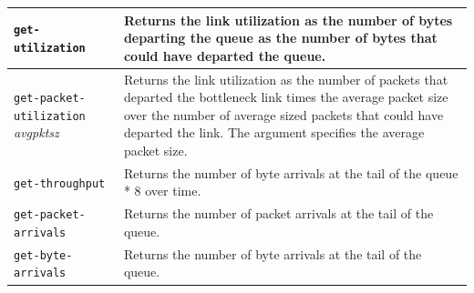 \documentclass[11pt]{article}
\begin{document}
\begin{table}[ht]
\begin{center}
\begin{tabular}{|l|l|}\hline
\verb|get-utilization|         & 
  \begin{minipage}[c]{3.5in}
  \vspace{0.05in}
  Returns the link utilization as the number of bytes departing 
  the queue as the number of bytes that could have departed the queue.
  \vspace{0.05in}
  \end{minipage} \\ \hline

\verb|get-packet-utilization| \emph{avgpktsz}& 
  \begin{minipage}[c]{3.5in} 
  \vspace{0.05in}
  Returns the link utilization as the number of packets that departed
  the bottleneck link times the average packet size over the number of
  average sized packets that could have departed the link.  The
  argument specifies the average packet size.
  \vspace{0.05in}
  \end{minipage} \\ \hline

\verb|get-throughput | &
  \begin{minipage}[c]{3.5in}
  \vspace{0.05in}
  Returns the number of byte arrivals at the tail of the queue * 8 
  over time.
  \vspace{0.05in}
  \end{minipage} \\ \hline

\verb|get-packet-arrivals| &
  \begin{minipage}[c]{3.5in}
  \vspace{0.05in}
  Returns the number of packet arrivals at the tail of the queue.
  \vspace{0.05in}
  \end{minipage} \\ \hline

\verb|get-byte-arrivals| &
  \begin{minipage}[c]{3.5in}
  \vspace{0.05in}
  Returns the number of byte arrivals at the tail of the queue.
  \vspace{0.05in}
  \end{minipage} \\ \hline


\end{tabular}
\end{center}
\end{table}
\end{document}
